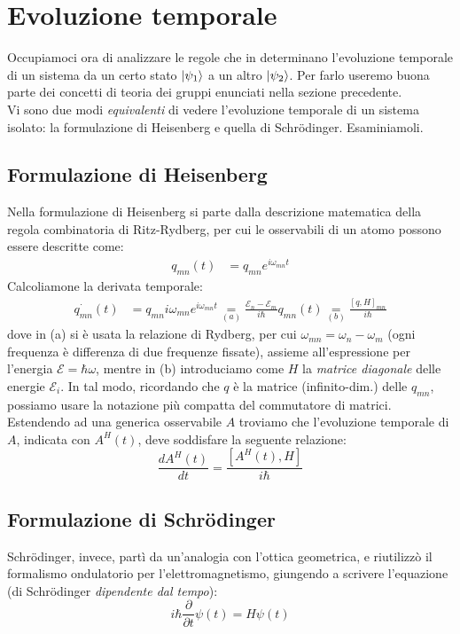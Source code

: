 \documentclass[../../FisicaTeorica.tex]{subfiles}
\begin{document}
\section{Evoluzione temporale}
\label{sec:time-evolution}
Occupiamoci ora di analizzare le regole che in \MQ determinano l'evoluzione temporale di un sistema da un certo stato $\Ket{\psi_1}$ a un altro $\Ket{\psi_2}$. Per farlo useremo buona parte dei concetti di teoria dei gruppi enunciati nella sezione precedente.\\
Vi sono due modi \textit{equivalenti} di vedere l'evoluzione temporale di un sistema isolato: la formulazione di Heisenberg e quella di Schr\"odinger. Esaminiamoli.

\subsection{Formulazione di Heisenberg}
Nella formulazione di Heisenberg si parte dalla descrizione matematica della regola combinatoria di Ritz-Rydberg, per cui le osservabili di un atomo possono essere descritte come:
\begin{align*}
q_{mn}\left(t\right)&=q_{mn}e^{i\omega_{mn}t}
\end{align*}
Calcoliamone la derivata temporale:
\begin{align*}
\dot{q_{mn}}\left(t\right)&=q_{mn} i\omega_{mn}e^{i\omega_{mn}t}\underset{(a)}{=}
\frac{\mathcal{E}_n-\mathcal{E}_m}{i\hbar}q_{mn}\left(t\right)\underset{(b)}{=}\frac{\left[q,H\right]_{mn}}{i\hbar}
\end{align*}
dove in (a) si è usata la relazione di Rydberg, per cui $\omega_{mn} = \omega_n - \omega_m$ (ogni frequenza è differenza di due frequenze fissate), assieme all'espressione per l'energia $\mathcal{E}=\hbar \omega$, mentre in (b) introduciamo come $H$ la \textit{matrice diagonale} delle energie $\mathcal{E}_i$. In tal modo, ricordando che $q$ è la matrice (infinito-dim.) delle $q_{mn}$, possiamo usare la notazione più compatta del commutatore di matrici.\\
Estendendo ad una generica osservabile $A$ troviamo che l'evoluzione temporale di $A$, indicata con $A^H\left(t\right)$, deve soddisfare la seguente relazione:
\[
\frac{dA^H(t)}{dt}=\frac{[A^H(t), H]}{i\hbar}
\]
\subsection{Formulazione di Schrödinger}
Schrödinger, invece, partì da un'analogia con l'ottica geometrica, e riutilizzò il formalismo ondulatorio per l'elettromagnetismo, giungendo a scrivere l'equazione (di Schr\"odinger \textit{dipendente dal tempo}):
\[
i\hbar \frac{\partial}{\partial t} \psi(t) = H\psi(t)
\]
\end{document}
